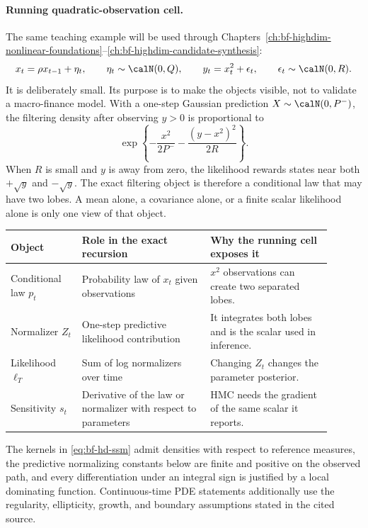 \paragraph{Running quadratic-observation cell.}
The same teaching example will be used through
Chapters~\ref{ch:bf-highdim-nonlinear-foundations}--\ref{ch:bf-highdim-candidate-synthesis}:
\begin{equation}
  x_t=\rho x_{t-1}+\eta_t,\qquad
  \eta_t\sim\calN(0,Q),\qquad
  y_t=x_t^2+\epsilon_t,\qquad
  \epsilon_t\sim\calN(0,R).
  \label{eq:bf-hd-running-cell}
\end{equation}
It is deliberately small.  Its purpose is to make the objects visible, not to
validate a macro-finance model.  With a one-step Gaussian prediction
\(X\sim\calN(0,P^-)\), the filtering density after observing \(y>0\) is
proportional to
\begin{equation}
  \exp\!\left\{-\frac{x^2}{2P^-}
  -\frac{(y-x^2)^2}{2R}\right\}.
  \label{eq:bf-hd-running-posterior}
\end{equation}
When \(R\) is small and \(y\) is away from zero, the likelihood rewards states
near both \(+\sqrt y\) and \(-\sqrt y\).  The exact filtering object is
therefore a conditional law that may have two lobes.  A mean alone, a covariance
alone, or a finite scalar likelihood alone is only one view of that object.

\small
\begin{longtable}{@{}p{0.20\linewidth}p{0.36\linewidth}p{0.34\linewidth}@{}}
\toprule
Object & Role in the exact recursion & Why the running cell exposes it \\
\midrule
\endhead
Conditional law \(p_t\) & Probability law of \(x_t\) given observations &
\(x^2\) observations can create two separated lobes. \\
Normalizer \(Z_t\) & One-step predictive likelihood contribution &
It integrates both lobes and is the scalar used in inference. \\
Likelihood \(\ell_T\) & Sum of log normalizers over time & Changing \(Z_t\)
changes the parameter posterior. \\
Sensitivity \(s_t\) & Derivative of the law or normalizer with respect to
parameters & HMC needs the gradient of the same scalar it reports. \\
\bottomrule
\end{longtable}
\normalsize

\begin{assumption}
\label{ass:bf-hd-dominated}
The kernels in \eqref{eq:bf-hd-ssm} admit densities with respect to reference
measures, the predictive normalizing constants below are finite and positive on
the observed path, and every differentiation under an integral sign is justified
by a local dominating function.  Continuous-time PDE statements additionally
use the regularity, ellipticity, growth, and boundary assumptions stated in the
cited source.
\end{assumption}

